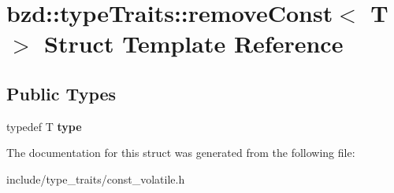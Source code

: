 \hypertarget{structbzd_1_1typeTraits_1_1removeConst}{}\section{bzd\+:\+:type\+Traits\+:\+:remove\+Const$<$ T $>$ Struct Template Reference}
\label{structbzd_1_1typeTraits_1_1removeConst}
\subsection*{Public Types}
\begin{DoxyCompactItemize}
\item 
\mbox{\label{structbzd_1_1typeTraits_1_1removeConst_ae41d155f12a2cbacd3175245bd574a0a}} 
typedef T {\bfseries type}
\end{DoxyCompactItemize}


The documentation for this struct was generated from the following file\+:\begin{DoxyCompactItemize}
\item 
include/type\+\_\+traits/const\+\_\+volatile.\+h\end{DoxyCompactItemize}
